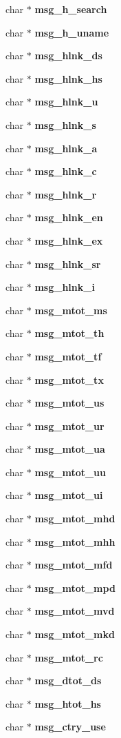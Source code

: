 \begin{CompactItemize}
char $\ast$ {\bf msg\_\-h\_\-search}
\item 
char $\ast$ {\bf msg\_\-h\_\-uname}
\item 
char $\ast$ {\bf msg\_\-hlnk\_\-ds}
\item 
char $\ast$ {\bf msg\_\-hlnk\_\-hs}
\item 
char $\ast$ {\bf msg\_\-hlnk\_\-u}
\item 
char $\ast$ {\bf msg\_\-hlnk\_\-s}
\item 
char $\ast$ {\bf msg\_\-hlnk\_\-a}
\item 
char $\ast$ {\bf msg\_\-hlnk\_\-c}
\item 
char $\ast$ {\bf msg\_\-hlnk\_\-r}
\item 
char $\ast$ {\bf msg\_\-hlnk\_\-en}
\item 
char $\ast$ {\bf msg\_\-hlnk\_\-ex}
\item 
char $\ast$ {\bf msg\_\-hlnk\_\-sr}
\item 
char $\ast$ {\bf msg\_\-hlnk\_\-i}
\item 
char $\ast$ {\bf msg\_\-mtot\_\-ms}
\item 
char $\ast$ {\bf msg\_\-mtot\_\-th}
\item 
char $\ast$ {\bf msg\_\-mtot\_\-tf}
\item 
char $\ast$ {\bf msg\_\-mtot\_\-tx}
\item 
char $\ast$ {\bf msg\_\-mtot\_\-us}
\item 
char $\ast$ {\bf msg\_\-mtot\_\-ur}
\item 
char $\ast$ {\bf msg\_\-mtot\_\-ua}
\item 
char $\ast$ {\bf msg\_\-mtot\_\-uu}
\item 
char $\ast$ {\bf msg\_\-mtot\_\-ui}
\item 
char $\ast$ {\bf msg\_\-mtot\_\-mhd}
\item 
char $\ast$ {\bf msg\_\-mtot\_\-mhh}
\item 
char $\ast$ {\bf msg\_\-mtot\_\-mfd}
\item 
char $\ast$ {\bf msg\_\-mtot\_\-mpd}
\item 
char $\ast$ {\bf msg\_\-mtot\_\-mvd}
\item 
char $\ast$ {\bf msg\_\-mtot\_\-mkd}
\item 
char $\ast$ {\bf msg\_\-mtot\_\-rc}
\item 
char $\ast$ {\bf msg\_\-dtot\_\-ds}
\item 
char $\ast$ {\bf msg\_\-htot\_\-hs}
\item 
char $\ast$ {\bf msg\_\-ctry\_\-use}

\end{CompactItemize}
